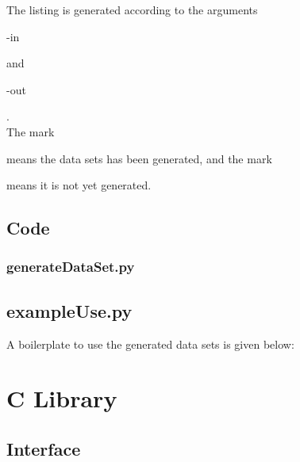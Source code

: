 The listing is generated according to the arguments \begin{ttfamily}-in\end{ttfamily} and \begin{ttfamily}-out\end{ttfamily}.\\

The mark \begin{ttfamily}[*]\end{ttfamily} means the data sets has been generated, and the mark \begin{ttfamily}[ ]\end{ttfamily} means it is not yet generated.

\subsection{Code}

\subsubsection{generateDataSet.py}

\begin{scriptsize}
\begin{ttfamily}

\end{ttfamily}
\end{scriptsize}

\subsection{exampleUse.py}

A boilerplate to use the generated data sets is given below:
 
\begin{scriptsize}
\begin{ttfamily}

\end{ttfamily}
\end{scriptsize}

\section{C Library}

\subsection{Interface}

\begin{scriptsize}
\begin{ttfamily}

\end{ttfamily}
\end{scriptsize}


